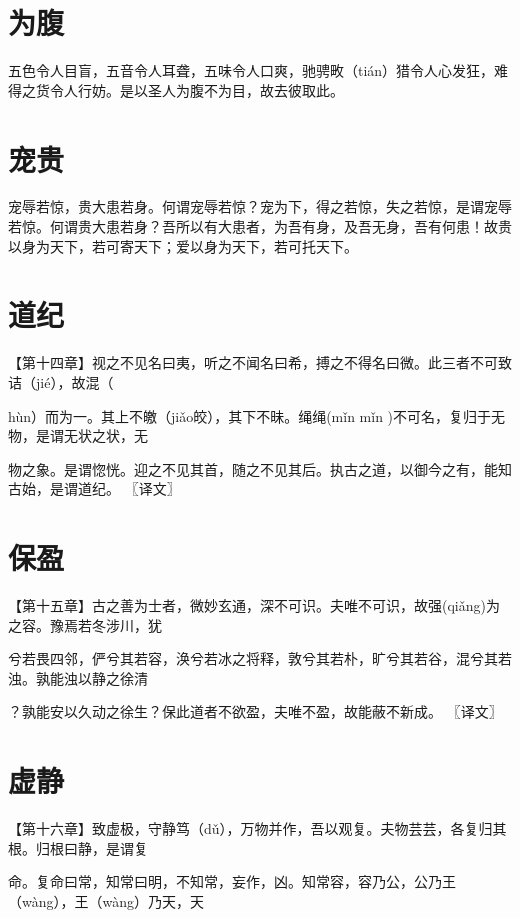 \documentclass[a4paper,12pt,UTF8,twoside]{ctexbook}
\begin{document}
	\chapter{为腹}
	
	五色令人目盲，五音令人耳聋，五味令人口爽，驰骋畋（tián）猎令人心发狂，难得之货令人行妨。是以圣人为腹不为目，故去彼取此。
	
	\chapter{宠贵}
	
	宠辱若惊，贵大患若身。何谓宠辱若惊？宠为下，得之若惊，失之若惊，是谓宠辱若惊。何谓贵大患若身？吾所以有大患者，为吾有身，及吾无身，吾有何患！故贵以身为天下，若可寄天下；爱以身为天下，若可托天下。
	
	\chapter{道纪}
	【第十四章】视之不见名曰夷，听之不闻名曰希，搏之不得名曰微。此三者不可致诘（jié），故混（
	
	hùn）而为一。其上不皦（jiǎo皎），其下不昧。绳绳(mǐn mǐn )不可名，复归于无物，是谓无状之状，无
	
	物之象。是谓惚恍。迎之不见其首，随之不见其后。执古之道，以御今之有，能知古始，是谓道纪。 〖译文〗
	
	
	
	
	\chapter{保盈}
	
	【第十五章】古之善为士者，微妙玄通，深不可识。夫唯不可识，故强(qiǎng)为之容。豫焉若冬涉川，犹
	
	兮若畏四邻，俨兮其若容，涣兮若冰之将释，敦兮其若朴，旷兮其若谷，混兮其若浊。孰能浊以静之徐清
	
	？孰能安以久动之徐生？保此道者不欲盈，夫唯不盈，故能蔽不新成。 〖译文〗
	
	
	
	\chapter{虚静}
	
	【第十六章】致虚极，守静笃（dǔ），万物并作，吾以观复。夫物芸芸，各复归其根。归根曰静，是谓复
	
	命。复命曰常，知常曰明，不知常，妄作，凶。知常容，容乃公，公乃王（wàng），王（wàng）乃天，天
	
\end{document}
